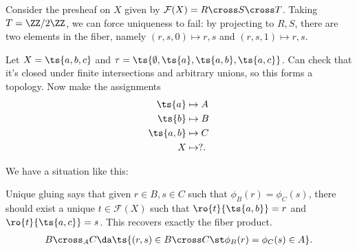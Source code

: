 \begin{example}

Consider the presheaf on \(X\) given by
\(\mathcal{F}(X) = R\cross S \cross T\). Taking \(T = \ZZ/2\ZZ\), we can
force uniqueness to fail: by projecting to \(R, S\), there are two
elements in the fiber, namely \((r,s,0)\mapsto r,s\) and
\((r,s,1)\mapsto r,s\).

\end{example}

\begin{example}

Let \(X = \ts{a, b, c}\) and
\(\tau = \ts{\emptyset, \ts{a}, \ts{a, b}, \ts{a, c}}\). Can check that
it's closed under finite intersections and arbitrary unions, so this
forms a topology. Now make the assignments
\begin{align*}  
\ts{a}& \mapsto A \\
\ts{b}& \mapsto B \\
\ts{a, b}& \mapsto C \\
X &\mapsto ?
.\end{align*}

We have a situation like this:

\begin{center}
\end{center}

Unique gluing says that given \(r\in B, s\in C\) such that
\(\phi_B(r) = \phi_C(s)\), there should exist a unique
\(t\in \mathcal{F}(X)\) such that \(\ro{t}{\ts{a, b}} = r\) and
\(\ro{t}{\ts{a, c}} = s\). This recovers exactly the fiber product.
\begin{align*}  
B \cross_A C \da \ts{(r, s) \in B\cross C \st \phi_B(r) = \phi_C(s) \in A}
.\end{align*}

\end{example}

